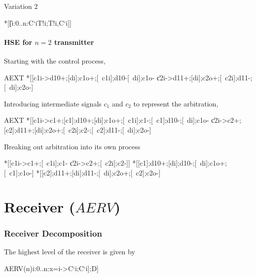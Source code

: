 \documentclass{article}
\begin{document}
\noindent Variation 2

  *[[\langle\|\!i:0..n:C`i\star\!T!i;T!i,C`i]]

\subsection{HSE for $n=2$ transmitter}

Starting with the control process,

\begin{hse}
AEXT\equiv
  *[[c1i->d10+;[di];c1o+;[~c1i];d10-[~di];c1o-
    \|c2i->d11+;[di];c2o+;[~c2i];d11-;[~di];c2o-]
\end{hse}

\noindent Introducing intermediate signals $c_1$ and $c_2$ to represent the arbitration,

\begin{hse}
AEXT\equiv
  *[[c1i->c1+;[c1];d10+;[di];c1o+;[~c1i];c1-;[~c1];d10-;[~di];c1o-
    \|c2i->c2+;[c2];d11+;[di];c2o+;[~c2i];c2-;[~c2];d11-;[~di];c2o-]
\end{hse}

\noindent Breaking out arbitration into its own process

\begin{hse}
  *[[c1i->c1+;[~c1i];c1-
    \|c2i->c2+;[~c2i];c2-]] \pll
  *[[c1];d10+;[di];d10-;[~di];c1o+;[~c1];c1o-] \pll
  *[[c2];d11+;[di];d11-;[~di];c2o+;[~c2];c2o-]
\end{hse}

\part{Receiver ($AERV$)}

\section{Receiver Decomposition}

The highest level of the receiver is given by

\begin{csp}
AERV(n)\equiv*[dec(D)?x;[\langle[]i:0..n:x=i->C`i;C`i];D]
\end{csp}
\end{document}
